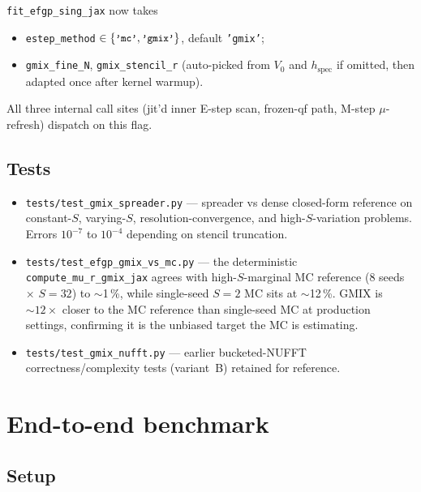 \documentclass[11pt]{article}
\newcommand{\code}[1]{\texttt{\small #1}}
\begin{document}
\code{fit\_efgp\_sing\_jax} now takes
\begin{itemize}
\item \code{estep\_method} $\in \{\code{'mc'}, \code{'gmix'}\}$,
default \code{'gmix'};
\item \code{gmix\_fine\_N}, \code{gmix\_stencil\_r} (auto-picked from
$V_0$ and $h_{\text{spec}}$ if omitted, then adapted once after
kernel warmup).
\end{itemize}
All three internal call sites (jit'd inner E-step scan, frozen-qf
path, M-step $\mu$-refresh) dispatch on this flag.

\subsection{Tests}

\begin{itemize}
\item \code{tests/test\_gmix\_spreader.py} --- spreader vs dense
closed-form reference on constant-$S$, varying-$S$,
resolution-convergence, and high-$S$-variation problems.  Errors
$10^{-7}$ to $10^{-4}$ depending on stencil truncation.
\item \code{tests/test\_efgp\_gmix\_vs\_mc.py} --- the deterministic
\code{compute\_mu\_r\_gmix\_jax} agrees with high-$S$-marginal MC
reference (8 seeds $\times$ $S\!=\!32$) to $\sim$1\,\%, while
single-seed $S\!=\!2$ MC sits at $\sim$12\,\%.  GMIX is $\sim 12\times$
closer to the MC reference than single-seed MC at production
settings, confirming it is the unbiased target the MC is
estimating.
\item \code{tests/test\_gmix\_nufft.py} --- earlier bucketed-NUFFT
correctness/complexity tests (variant~B) retained for reference.
\end{itemize}

\section{End-to-end benchmark}
\label{sec:bench}

\subsection{Setup}
\end{document}
